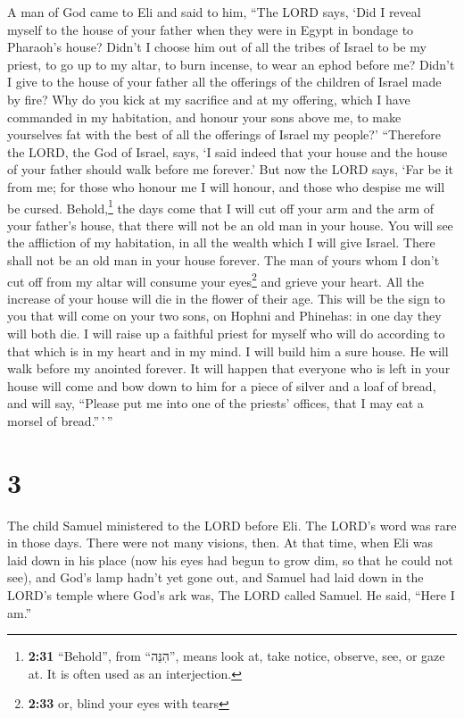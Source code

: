  A man of God came to Eli and said to him, ``The LORD
says, `Did I reveal myself to the house of your father when they were in
Egypt in bondage to Pharaoh's house?  Didn't I choose him
out of all the tribes of Israel to be my priest, to go up to my altar,
to burn incense, to wear an ephod before me? Didn't I give to the house
of your father all the offerings of the children of Israel made by fire?
 Why do you kick at my sacrifice and at my offering,
which I have commanded in my habitation, and honour your sons above me,
to make yourselves fat with the best of all the offerings of Israel my
people?'  ``Therefore the LORD, the God of Israel, says,
`I said indeed that your house and the house of your father should walk
before me forever.' But now the LORD says, `Far be it from me; for those
who honour me I will honour, and those who despise me will be cursed.
 Behold,\footnote{\textbf{2:31} ``Behold'', from
  ``הִנֵּה'', means look at, take notice, observe, see, or gaze at. It
  is often used as an interjection.} the days come that I will cut off
your arm and the arm of your father's house, that there will not be an
old man in your house.  You will see the affliction of my
habitation, in all the wealth which I will give Israel. There shall not
be an old man in your house forever.  The man of yours
whom I don't cut off from my altar will consume your eyes\footnote{\textbf{2:33}
  or, blind your eyes with tears} and grieve your heart. All the
increase of your house will die in the flower of their age.
 This will be the sign to you that will come on your two
sons, on Hophni and Phinehas: in one day they will both die.
 I will raise up a faithful priest for myself who will do
according to that which is in my heart and in my mind. I will build him
a sure house. He will walk before my anointed forever. 
It will happen that everyone who is left in your house will come and bow
down to him for a piece of silver and a loaf of bread, and will say,
``Please put me into one of the priests' offices, that I may eat a
morsel of bread.''\,'\,''

\hypertarget{section-2}{%
\section{3}\label{section-2}}

 The child Samuel ministered to the LORD before Eli. The
LORD's word was rare in those days. There were not many visions, then.
 At that time, when Eli was laid down in his place (now
his eyes had begun to grow dim, so that he could not see),
 and God's lamp hadn't yet gone out, and Samuel had laid
down in the LORD's temple where God's ark was,  The LORD
called Samuel. He said, ``Here I am.''

